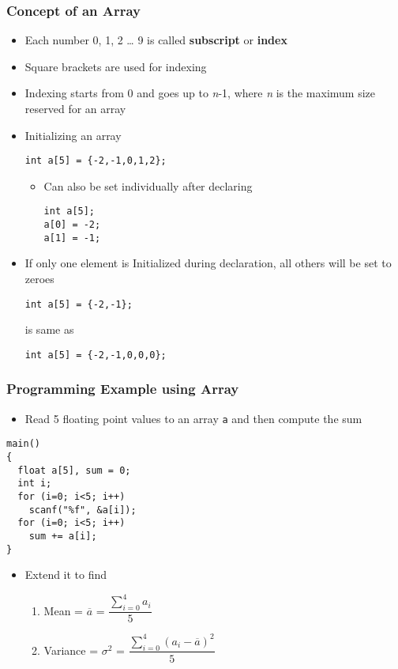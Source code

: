 \documentclass[11pt]{beamer}
\begin{document}
\begin{frame}[fragile]\frametitle{Concept of an Array}
\label{sec-1-2}

\begin{itemize}
\item Each number 0, 1, 2 \ldots{} 9 is called \textbf{subscript} or \textbf{index}
\item Square brackets are used for indexing
\item Indexing starts from 0 and goes up to \emph{n}-1, where \emph{n} is the maximum size reserved for an array
\item Initializing an array 

\begin{verbatim}
int a[5] = {-2,-1,0,1,2};
\end{verbatim}
\begin{itemize}
\item Can also be set individually after declaring

\begin{verbatim}
int a[5];
a[0] = -2;
a[1] = -1;
\end{verbatim}
\end{itemize}

\item If only one element is Initialized during declaration, all others will be set to zeroes

\begin{verbatim}
int a[5] = {-2,-1};
\end{verbatim}
  is same as

\begin{verbatim}
int a[5] = {-2,-1,0,0,0};
\end{verbatim}
\end{itemize}
\end{frame}
\begin{frame}[fragile]\frametitle{Programming Example using Array}
\label{sec-1-3}

\begin{itemize}
\item Read 5 floating point values to an array \verb~a~ and then compute the sum
\end{itemize}

\begin{verbatim}
main()
{
  float a[5], sum = 0;
  int i;
  for (i=0; i<5; i++)
    scanf("%f", &a[i]);
  for (i=0; i<5; i++)
    sum += a[i];
}
\end{verbatim}

\begin{itemize}
\item Extend it to find
\begin{enumerate}
\item Mean = $\overline{a}$ = $\dfrac{\sum_{i=0}^4 a_i}{5}$
\item Variance = $\sigma$$^2$ =  $\dfrac{\sum_{i=0}^4\left(a_i - \overline{a}\right)^2}{5}$
\end{enumerate}
\end{itemize}
\end{frame}
\end{document}
